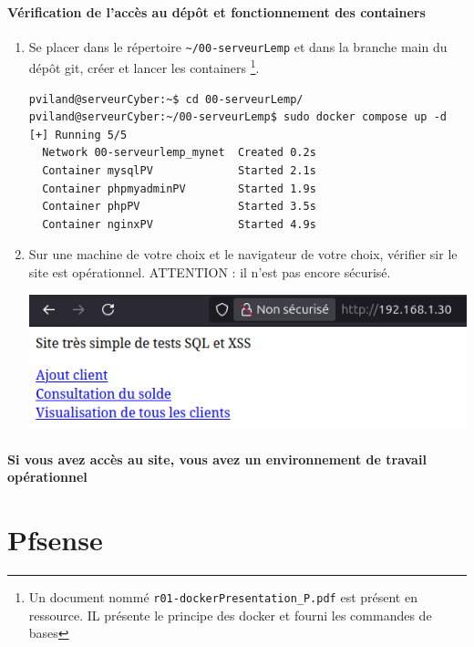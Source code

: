 \documentclass[french, 12pt]{article}%
\begin{document}
\paragraph{Vérification de l'accès au dépôt et fonctionnement des containers}

\begin{enumerate}[resume]


\item Se placer dans le répertoire \verb?~/00-serveurLemp? et dans la branche main du dépôt git, créer et lancer les containers \footnote{Un document nommé \texttt{r01-dockerPresentation\_P.pdf}  est présent en ressource. IL présente le principe des docker et fourni les commandes de bases }. 


\begin{lstlisting}[style=commande]
pviland@serveurCyber:~$ cd 00-serveurLemp/
pviland@serveurCyber:~/00-serveurLemp$ sudo docker compose up -d
[+] Running 5/5
  Network 00-serveurlemp_mynet  Created 0.2s
  Container mysqlPV             Started 2.1s
  Container phpmyadminPV        Started 1.9s
  Container phpPV               Started 3.5s
  Container nginxPV             Started 4.9s
\end{lstlisting}

\item Sur une machine de votre choix et le navigateur de votre choix, vérifier sir le site est opérationnel. ATTENTION : il n'est pas encore sécurisé.

\begin{center}
\includegraphics[scale=0.5]{./ressource/exServeurNonsecur.png}
\end{center}

\end{enumerate}

\paragraph{Si vous avez accès au site, vous avez un environnement de travail opérationnel}

\section{Pfsense}
\end{document}
